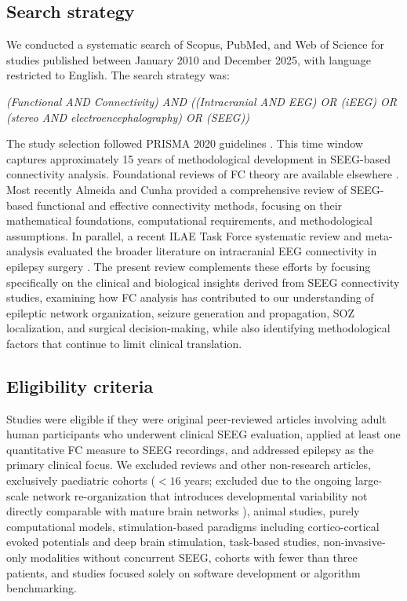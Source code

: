 \documentclass[12pt]{article}
\begin{document}
\subsection{Search strategy}

We conducted a systematic search of Scopus, PubMed, and Web of Science for studies published between January 2010 and December 2025, with language restricted to English. The search strategy was: 

\begin{center}
\textit{(Functional AND Connectivity) AND 
((Intracranial AND EEG) OR (iEEG) OR 
(stereo AND electroencephalography) OR (SEEG))
}
\end{center}

The study selection followed PRISMA 2020 guidelines \cite{page2021prisma}. This time window captures approximately 15 years of methodological development in SEEG-based connectivity analysis. Foundational reviews of FC theory are available elsewhere \cite{bastos2016tutorial, bartolomei2017defining, Stergiadis2023-fl}. Most recently Almeida and Cunha \cite{Almeida2026-zi} provided a comprehensive review of SEEG-based functional and effective connectivity methods, focusing on their mathematical foundations, computational requirements, and methodological assumptions. In parallel, a recent ILAE Task Force systematic review and meta-analysis evaluated the broader literature on intracranial EEG connectivity in epilepsy surgery \cite{Sinha2026-mu}. The present review complements these efforts by focusing specifically on the clinical and biological insights derived from SEEG connectivity studies, examining how FC analysis has contributed to our understanding of epileptic network organization, seizure generation and propagation, SOZ localization, and surgical decision-making, while also identifying methodological factors that continue to limit clinical translation. 

\subsection{Eligibility criteria}
Studies were eligible if they were original peer-reviewed articles involving adult human participants who underwent clinical SEEG evaluation, applied at least one quantitative FC measure to SEEG recordings, and addressed epilepsy as the primary clinical focus. We excluded reviews and other non-research articles, exclusively paediatric cohorts ($<16$ years; excluded due to the ongoing large-scale network re-organization that introduces developmental variability not directly comparable with mature brain networks \cite{Spear2013-cd,Power2010-pl}), animal studies, purely computational models, stimulation-based paradigms including cortico-cortical evoked potentials and deep brain stimulation, task-based studies, non-invasive-only modalities without concurrent SEEG, cohorts with fewer than three patients, and studies focused solely on software development or algorithm benchmarking.
\end{document}
